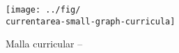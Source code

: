 \documentclass[a4paper,10pt]{book}
\begin{document}


\begin{landscape}
\begin{figure}
	\texttt{[image: ../fig/\\currentarea-small-graph-curricula]}
	\label{fig:malla-curricular}
	\caption{Malla curricular \SchoolFullName -- \siglas}
\end{figure}
\end{landscape}
\end{document}
